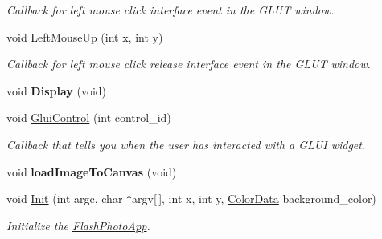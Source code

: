 \begin{DoxyCompactItemize}
\begin{DoxyCompactList}\small\item\em Callback for left mouse click interface event in the G\+L\+UT window. \end{DoxyCompactList}\item 
void \hyperlink{classimage__tools_1_1FlashPhotoApp_ab2fb593952915731ec50da0a4a20d097}{Left\+Mouse\+Up} (int x, int y)\hypertarget{classimage__tools_1_1FlashPhotoApp_ab2fb593952915731ec50da0a4a20d097}{}\label{classimage__tools_1_1FlashPhotoApp_ab2fb593952915731ec50da0a4a20d097}

\begin{DoxyCompactList}\small\item\em Callback for left mouse click release interface event in the G\+L\+UT window. \end{DoxyCompactList}\item 
void {\bfseries Display} (void)\hypertarget{classimage__tools_1_1FlashPhotoApp_a3ee0b08c0e7096652ef8dc549a684f76}{}\label{classimage__tools_1_1FlashPhotoApp_a3ee0b08c0e7096652ef8dc549a684f76}

\item 
void \hyperlink{classimage__tools_1_1FlashPhotoApp_a1cfe5fd1baf32a23264a6eff88987baf}{Glui\+Control} (int control\+\_\+id)\hypertarget{classimage__tools_1_1FlashPhotoApp_a1cfe5fd1baf32a23264a6eff88987baf}{}\label{classimage__tools_1_1FlashPhotoApp_a1cfe5fd1baf32a23264a6eff88987baf}

\begin{DoxyCompactList}\small\item\em Callback that tells you when the user has interacted with a G\+L\+UI widget. \end{DoxyCompactList}\item 
void {\bfseries load\+Image\+To\+Canvas} (void)\hypertarget{classimage__tools_1_1FlashPhotoApp_ab2846c67075308d42fab1f2f8a05bc17}{}\label{classimage__tools_1_1FlashPhotoApp_ab2846c67075308d42fab1f2f8a05bc17}

\item 
void \hyperlink{classimage__tools_1_1FlashPhotoApp_a1bf24fa1a123732fe5d5e1964974dec1}{Init} (int argc, char $\ast$argv\mbox{[}$\,$\mbox{]}, int x, int y, \hyperlink{classimage__tools_1_1ColorData}{Color\+Data} background\+\_\+color)
\begin{DoxyCompactList}\small\item\em Initialize the \hyperlink{classimage__tools_1_1FlashPhotoApp}{Flash\+Photo\+App}. \end{DoxyCompactList}\end{DoxyCompactItemize}
